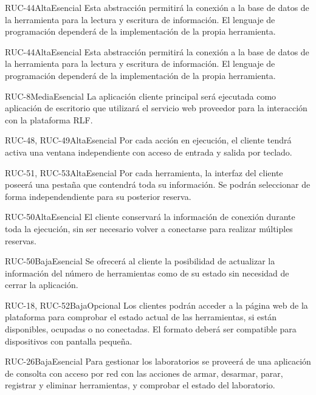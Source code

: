 {RUC-44}{Alta}{Esencial}
{
Esta abstracción permitirá la conexión a la base de datos de la 
herramienta para la lectura y escritura de información. El lenguaje de 
programación dependerá de la implementación de la propia herramienta.
}

{RUC-44}{Alta}{Esencial}
{
Esta abstracción permitirá la conexión a la base de datos de la 
herramienta para la lectura y escritura de información. El lenguaje de 
programación dependerá de la implementación de la propia herramienta.
}

{RUC-8}{Media}{Esencial}
{
La aplicación cliente principal será ejecutada como aplicación de 
escritorio que utilizará el servicio web proveedor para la 
interacción con la plataforma RLF.
}

{RUC-48, RUC-49}{Alta}{Esencial}
{
Por cada acción en ejecución, el cliente tendrá activa una ventana 
independiente con acceso de entrada y salida por teclado.
}

{RUC-51, RUC-53}{Alta}{Esencial}
{
Por cada herramienta, la interfaz del cliente poseerá una pestaña que 
contendrá toda su información. Se podrán seleccionar de forma 
independendiente para su posterior reserva.
}

{RUC-50}{Alta}{Esencial}
{
El cliente conservará la información de conexión durante toda la 
ejecución, sin ser necesario volver a conectarse para realizar 
múltiples reservas.
}

{RUC-50}{Baja}{Esencial}
{
Se ofrecerá al cliente la posibilidad de actualizar la información 
del número de herramientas como de su estado sin necesidad de cerrar 
la aplicación.
}

{RUC-18, RUC-52}{Baja}{Opcional}
{
Los clientes podrán acceder a la página web de la plataforma para 
comprobar el estado actual de las herramientas, si están disponibles, 
ocupadas o no conectadas. El formato deberá ser compatible para 
dispositivos con pantalla pequeña.
}

{RUC-26}{Baja}{Esencial}
{
Para gestionar los laboratorios se proveerá de una aplicación de 
consolta con acceso por red con las acciones de armar, desarmar, 
parar, registrar y eliminar herramientas, y comprobar el estado del 
laboratorio.
}

